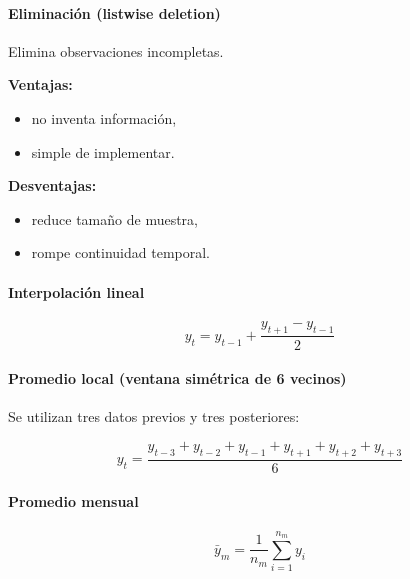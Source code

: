 \paragraph{Eliminación (listwise deletion)}

Elimina observaciones incompletas.

\textbf{Ventajas:}
\begin{itemize}
\item no inventa información,
\item simple de implementar.
\end{itemize}

\textbf{Desventajas:}
\begin{itemize}
\item reduce tamaño de muestra,
\item rompe continuidad temporal.
\end{itemize}

\paragraph{Interpolación lineal}

\[
y_t =
y_{t-1}
+
\frac{y_{t+1}-y_{t-1}}{2}
\]

\paragraph{Promedio local (ventana simétrica de 6 vecinos)}

Se utilizan tres datos previos y tres posteriores:

\[
y_t =
\frac{
y_{t-3}+y_{t-2}+y_{t-1}
+y_{t+1}+y_{t+2}+y_{t+3}
}{6}
\]

\paragraph{Promedio mensual}

\[
\bar y_m =
\frac{1}{n_m}
\sum_{i=1}^{n_m} y_i
\]

